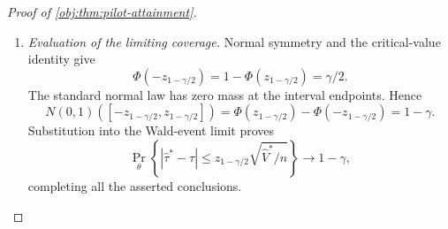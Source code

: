 \documentclass[11pt]{article}
\begin{document}
\begin{proof}[Proof of \cref{obj:thm:pilot-attainment}]
\begin{enumerate}
For each fixed pilot, product normalization and the exact correction mean give
\[
\begin{aligned}
&\sum_{\mathbf s\in\mathcal S^{N_n}}
\left(\prod_{j=1}^{N_n}
\omega_{\theta,\vartheta_n(\mathbf r)}(s_j)\right)
\left\{
c^\top\vartheta_n(\mathbf r)
+\frac1{N_n}\sum_{j=1}^{N_n}
\phi_{\vartheta_n(\mathbf r)}(s_j)
-c^\top\theta
\right\}\\
&\hspace{2cm}
=c^\top\vartheta_n(\mathbf r)
+\frac{N_n}{N_n}
c^\top(\theta-\vartheta_n(\mathbf r))
-c^\top\theta
=0.
\end{aligned}
\]
Multiplication by \(w_{n,0}(\mathbf r)\) shows that the integral of
\(\widehat\tau^*-\tau\) over every pilot-prefix cell is zero. A prefix incompatible with the pilot release type has zero mass, so its cell integral is also zero.

A function \(f\) satisfying the statement is constant on each such cell. Summing the zero cell integrals, each multiplied by its corresponding value of \(f\), gives
\[
\mathbb E_\theta[(\widehat\tau^*-\tau)f]=0.
\]
The transcript space is finite and the estimator and \(f\) are real-valued, so their product is integrable under the transcript probability law.

\item \emph{Evaluation of the limiting coverage.}
Normal symmetry and the critical-value identity give
\[
\Phi(-z_{1-\gamma/2})
=1-\Phi(z_{1-\gamma/2})
=\gamma/2.
\]
The standard normal law has zero mass at the interval endpoints. Hence
\[
N(0,1)([-z_{1-\gamma/2},z_{1-\gamma/2}])
=
\Phi(z_{1-\gamma/2})-\Phi(-z_{1-\gamma/2})
=
1-\gamma.
\]
Substitution into the Wald-event limit proves
\[
\Pr_\theta\left\{
|\widehat\tau^*-\tau|
\le z_{1-\gamma/2}\sqrt{\widehat V^*/n}
\right\}\longrightarrow1-\gamma,
\]
completing all the asserted conclusions.
\end{enumerate}
\end{proof}
\end{document}
